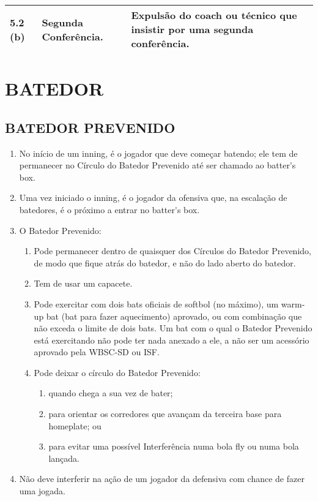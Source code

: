 {\footnotesize
	\begin{tabular}{p{}p{}|p{}}\hline\hline
		5.2 (b) & Segunda Confer\^encia. &Expuls\~ao do \gls{coach} ou t\'ecnico que insistir por uma segunda confer\^encia. \\\hline
		
\end{tabular}}


\section{BATEDOR}

	\subsection{BATEDOR PREVENIDO}
		\begin{multicols}{2}
			\begin{enumerate}[label=\alph*)]
				\item No in\'icio de um \gls{inning}, \'e o jogador que deve come\c{c}ar batendo; ele tem de permanecer no C\'irculo do Batedor Prevenido at\'e ser chamado ao \gls{batter's box}. 
				
				\item  Uma vez iniciado o \gls{inning}, \'e o jogador da ofensiva que, na escala\c{c}\~ao de batedores, \'e o pr\'oximo a entrar no \gls{batter's box}. 
				
				\item  O Batedor Prevenido: 
				
				\begin{enumerate}[label=\roman*.]
					\item   Pode permanecer dentro de quaisquer dos C\'irculos do Batedor Prevenido, de 
					modo que fique atr\'as do batedor, e n\~ao do lado aberto do batedor. 
					\item   Tem de usar um capacete. 
					\item   Pode exercitar com dois \glspl{bat} oficiais de softbol (no m\'aximo), um \gls{warm-up bat} (\gls{bat} para fazer aquecimento) aprovado, ou com combina\c{c}\~ao que n\~ao exceda o limite de dois \glspl{bat}. Um \gls{bat} com o qual o Batedor Prevenido est\'a exercitando n\~ao pode ter nada anexado a ele, a n\~ao ser um acess\'orio aprovado pela WBSC-SD ou ISF. 
					\item   Pode deixar o c\'irculo do Batedor Prevenido: 
					\begin{enumerate}[label=\arabic*)]
						\item  quando chega a sua vez de bater; 
						\item para orientar os corredores que avan\c{c}am da terceira base para \gls{homeplate}; ou 
						\item para evitar uma poss\'ivel Interfer\^encia numa bola \gls{fly} ou numa bola lan\c{c}ada. 
					\end{enumerate}	
				\end{enumerate}
				\item  N\~ao deve interferir na a\c{c}\~ao de um jogador da defensiva com chance de fazer uma jogada. 
			\end{enumerate}
			

\end{multicols}
